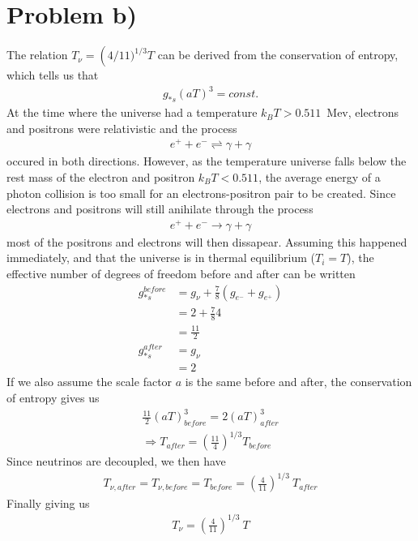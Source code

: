 \documentclass[reprint,english,notitlepage]{revtex4-1}  %
\numberwithin{equation}{section}
\begin{document}
\section{Problem b)}
The relation $T_\nu = \left(4/11)^{1/3} T$ can be derived from the conservation
of entropy, which tells us that
\begin{align}
	g_{*s}(aT)^3 = const.
\end{align}
At the time where the universe had a temperature $k_B T > 0.511$ Mev, electrons
and positrons were relativistic and the process
\begin{align}
	e^+ + e^- \rightleftharpoons \gamma + \gamma
\end{align}
occured in both directions. However, as the temperature universe falls below the
rest mass of the electron and positron $k_B T < 0.511$, the average energy of a
photon collision is too small for an electrons-positron pair to be created.
Since electrons and positrons will still anihilate through the process
\begin{align}
	e^+ + e^- \rightarrow \gamma + \gamma
\end{align}
most of the positrons and electrons will then dissapear. Assuming this happened
immediately, and that the universe is in thermal equilibrium ($T_i=T$), the
effective number of degrees of freedom before and after can be written
\begin{align}
	g_{*s}^{before} &= g_\nu + \frac{7}{8}(g_{e^-} + g_{e^+}) \\
									&= 2 + \frac{7}{8}4 \\
									&= \frac{11}{2} \\
	g_{*s}^{after} &= g_\nu \\
								 &= 2
\end{align}
If we also assume the scale factor $a$ is the same before and after, the
conservation of entropy gives us
\begin{align}
	\frac{11}{2}(aT)_{before}^3 = 2(aT)_{after}^3 \\
	\Rightarrow T_{after} = (\frac{11}{4})^{1/3} T_{before}
\end{align}
Since neutrinos are decoupled, we then have
\begin{align}
	T_{\nu,after} = T_{\nu,before} = T_{before} = \left(\frac{4}{11}\right)^{1/3} \ T_{after}
\end{align}
Finally giving us
\begin{align}
	T_\nu = \left(\frac{4}{11}\right)^{1/3} \ T
\end{align}
\end{document}
